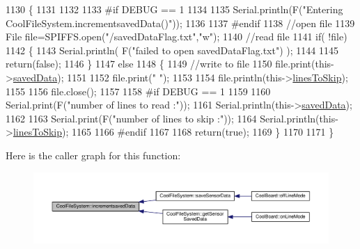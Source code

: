 \begin{DoxyCode}
1130 \{
1131 
1132 
1133 \textcolor{preprocessor}{#if DEBUG == 1}
1134     
1135     Serial.println(F(\textcolor{stringliteral}{"Entering CoolFileSystem.incrementsavedData()"}));  
1136     
1137 \textcolor{preprocessor}{#endif}
1138     \textcolor{comment}{//open file}
1139     File file=SPIFFS.open(\textcolor{stringliteral}{"/savedDataFlag.txt"},\textcolor{stringliteral}{"w"});    
1140     \textcolor{comment}{//read file}
1141     \textcolor{keywordflow}{if}( !file)  
1142     \{
1143         Serial.println( F(\textcolor{stringliteral}{"failed to open savedDataFlag.txt"}) );
1144         
1145         \textcolor{keywordflow}{return}(\textcolor{keyword}{false});      
1146     \}
1147     \textcolor{keywordflow}{else}
1148     \{       
1149         \textcolor{comment}{//write to file }
1150         file.print(this->\hyperlink{class_cool_file_system_ad9f5b739a32100f5f21270c3d9ee2b1d}{savedData});
1151         
1152         file.print(\textcolor{stringliteral}{" "});
1153         
1154         file.println(this->\hyperlink{class_cool_file_system_a84fdb6057e534b395512463daa28ea3c}{linesToSkip});
1155     
1156         file.close();
1157 
1158 \textcolor{preprocessor}{    #if DEBUG == 1}
1159 
1160         Serial.print(F(\textcolor{stringliteral}{"number of lines to read :"}));
1161         Serial.println(this->\hyperlink{class_cool_file_system_ad9f5b739a32100f5f21270c3d9ee2b1d}{savedData});
1162     
1163         Serial.print(F(\textcolor{stringliteral}{"number of lines to skip :"}));
1164         Serial.println(this->\hyperlink{class_cool_file_system_a84fdb6057e534b395512463daa28ea3c}{linesToSkip});
1165 
1166 \textcolor{preprocessor}{    #endif}
1167         
1168         \textcolor{keywordflow}{return}(\textcolor{keyword}{true});
1169     \}
1170     
1171 \}
\end{DoxyCode}
Here is the caller graph for this function\+:\nopagebreak
\begin{figure}[H]
\begin{center}
\leavevmode
\includegraphics[width=350pt]{db/d0c/class_cool_file_system_aae045125288f255f3e258073dcada2a6_icgraph}
\end{center}
\end{figure}
\mbox{\label{class_cool_file_system_ac86a40e7c3a1842f7342f698d34324f9}} 
